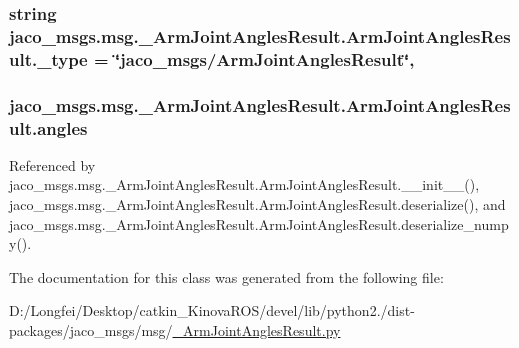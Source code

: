 \subsubsection[{\texorpdfstring{\+\_\+type}{_type}}]{\setlength{\rightskip}{0pt plus 5cm}string jaco\+\_\+msgs.\+msg.\+\_\+\+Arm\+Joint\+Angles\+Result.\+Arm\+Joint\+Angles\+Result.\+\_\+type = \char`\"{}jaco\+\_\+msgs/{\bf Arm\+Joint\+Angles\+Result}\char`\"{}\hspace{0.3cm}{\ttfamily [static]}, {\ttfamily [private]}}\hypertarget{classjaco__msgs_1_1msg_1_1__ArmJointAnglesResult_1_1ArmJointAnglesResult_a7e0375d86788c1f062334e13db09adda}{}\label{classjaco__msgs_1_1msg_1_1__ArmJointAnglesResult_1_1ArmJointAnglesResult_a7e0375d86788c1f062334e13db09adda}
\subsubsection[{\texorpdfstring{angles}{angles}}]{\setlength{\rightskip}{0pt plus 5cm}jaco\+\_\+msgs.\+msg.\+\_\+\+Arm\+Joint\+Angles\+Result.\+Arm\+Joint\+Angles\+Result.\+angles}\hypertarget{classjaco__msgs_1_1msg_1_1__ArmJointAnglesResult_1_1ArmJointAnglesResult_adf48c1897be485b663d0e2bf26308e07}{}\label{classjaco__msgs_1_1msg_1_1__ArmJointAnglesResult_1_1ArmJointAnglesResult_adf48c1897be485b663d0e2bf26308e07}


Referenced by jaco\+\_\+msgs.\+msg.\+\_\+\+Arm\+Joint\+Angles\+Result.\+Arm\+Joint\+Angles\+Result.\+\_\+\+\_\+init\+\_\+\+\_\+(), jaco\+\_\+msgs.\+msg.\+\_\+\+Arm\+Joint\+Angles\+Result.\+Arm\+Joint\+Angles\+Result.\+deserialize(), and jaco\+\_\+msgs.\+msg.\+\_\+\+Arm\+Joint\+Angles\+Result.\+Arm\+Joint\+Angles\+Result.\+deserialize\+\_\+numpy().



The documentation for this class was generated from the following file\+:\begin{DoxyCompactItemize}
\item 
D\+:/\+Longfei/\+Desktop/catkin\+\_\+\+Kinova\+R\+O\+S/devel/lib/python2./dist-\/packages/jaco\+\_\+msgs/msg/\hyperlink{__ArmJointAnglesResult_8py}{\+\_\+\+Arm\+Joint\+Angles\+Result.\+py}\end{DoxyCompactItemize}

